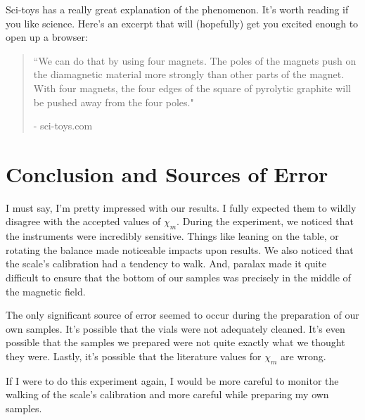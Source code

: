 \documentclass{article}
\begin{document}
Sci-toys has a really great explanation of the phenomenon. It's worth reading
if you like science. Here's an excerpt that will (hopefully) get you excited
enough to open up a browser:
\begin{quotation}

 ``We can do that by using four magnets. The poles of the magnets push on the
 diamagnetic material more strongly than other parts of the magnet. With four
 magnets, the four edges of the square of pyrolytic graphite will be pushed
 away from the four poles."

 - sci-toys.com

\end{quotation}

\section{Conclusion and Sources of Error}

I must say, I'm pretty impressed with our results. I fully expected them to
wildly disagree with the accepted values of $\chi_m$. During the experiment, we
noticed that the instruments were incredibly sensitive. Things like leaning on
the table, or rotating the balance made noticeable impacts upon results. We
also noticed that the scale's calibration had a tendency to walk. And, paralax
made it quite difficult to ensure that the bottom of our samples was precisely
in the middle of the magnetic field. 

The only significant source of error seemed to occur during the preparation of
our own samples. It's possible that the vials were not adequately cleaned. It's
even possible that the samples we prepared were not quite exactly what we
thought they were. Lastly, it's possible that the literature values for
$\chi_m$ are wrong.

If I were to do this experiment again, I would be more careful to monitor the
walking of the scale's calibration and more careful while preparing my own
samples.
\end{document}
